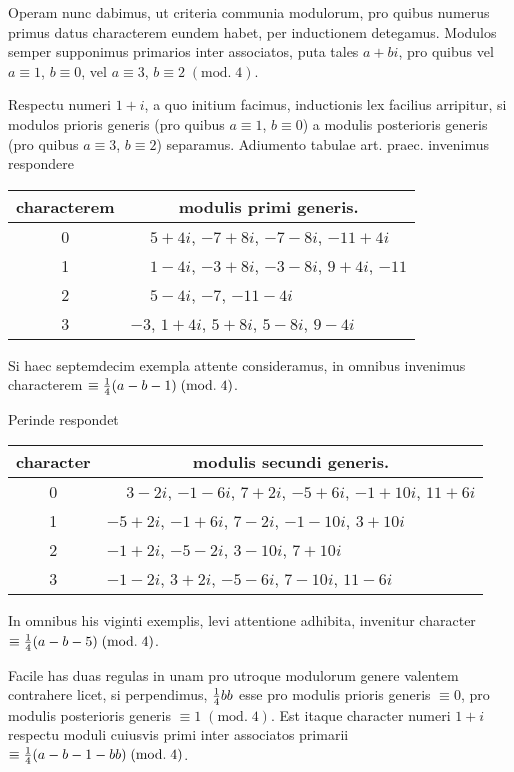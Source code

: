 \documentclass[twoside,12pt]{memoir}
\renewcommand{\pmod}[1]{\;(\textrm{mod.}\;#1)}
\let\oldfrac\frac
\def\frac#1#2{\mathchoice{\tfrac{#1}{#2}}{\oldfrac{#1}{#2}}{\genfrac{}{}{}{2}{#1}{#2\mathstrut}}{\genfrac{}{}{}{3}{#1}{#2\mathstrut}}}
\begin{document}
Operam nunc dabimus, ut criteria communia modulorum, pro quibus numerus primus datus characterem eundem habet, per inductionem detegamus. Modulos semper supponimus primarios inter associatos, puta tales \(a+b i\), pro quibus vel \(a \equiv 1\), \( b \equiv 0\), vel \(a \equiv 3\), \( b \equiv 2\pmod{4}\).
 
Respectu numeri \(1+i\), a quo initium facimus, inductionis lex facilius arripitur, si modulos prioris generis (pro quibus \(a \equiv 1\), \( b \equiv 0\)) a modulis posterioris generis (pro quibus \(a \equiv 3\), \( b \equiv 2\)) separamus. Adiumento tabulae art. praec. invenimus respondere\pagebreak%
\begin{center}
\begin{tabular}{c|l}
characterem & \multicolumn{1}{c}{modulis primi generis.} \\
\hline
0 & \(\phantom{+}5+4 i\), \(-7+8 i\), \(-7-8 i\), \(-11+4 i\) \\
1 & \(\phantom{+}1-4 i\), \(-3+8 i\), \(-3-8 i\), \( 9+4i\), \(-11\) \\
2 & \(\phantom{+}5-4 i\), \(-7\), \(-11-4 i\) \\
3 & \(-3\), \(1+4 i\), \( 5+8 i\), \( 5-8 i\), \( 9-4 i\) \\
\end{tabular}
\end{center}
Si haec septemdecim exempla attente consideramus, in omnibus invenimus characterem \(\equiv \frac{1}{4}(a-b-1)\pmod{4}\).

Perinde respondet
\begin{center}
\begin{tabular}{c|l}
character & \multicolumn{1}{c}{modulis secundi generis.} \\
\hline
0 & \(\phantom{+}3-2 i\), \(-1-6 i\), \( 7+2 i\), \(-5+6 i\), \(-1+10 i\), \( 11+6 i\) \\
1 & \(-5+2 i\), \(-1+6 i\), \( 7-2 i\), \(-1-10 i\), \( 3+10 i\) \\
2 & \(-1+2 i\), \(-5-2 i\), \( 3-10 i\), \( 7+10 i\) \\
3 & \(-1-2 i\), \( 3+2 i\), \(-5-6 i\), \( 7-10 i\), \( 11-6 i\) \\
\end{tabular}
\end{center}
In omnibus his viginti exemplis, levi attentione adhibita, invenitur character \(\equiv \frac{1}{4}(a-b-5)\pmod{4}\).

Facile has duas regulas in unam pro utroque modulorum genere valentem contrahere licet, si perpendimus, \(\frac{1}{4} b b\) esse pro modulis prioris generis \(\equiv 0\), pro modulis posterioris generis \(\equiv 1\pmod{4}\). Est itaque character numeri \(1+i\) respectu moduli cuiusvis primi inter associatos primarii \(\equiv \frac{1}{4}(a-b-1-b b)\pmod{4}\).
 
\end{document}
